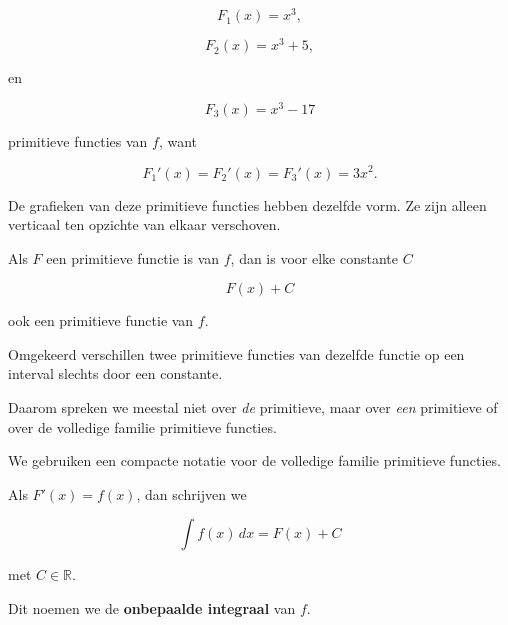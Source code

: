 \documentclass{ximera}
\begin{document}
\[
F_1(x)=x^3,
\]

\[
F_2(x)=x^3+5,
\]

en

\[
F_3(x)=x^3-17
\]

primitieve functies van \(f\), want

\[
F_1'(x)=F_2'(x)=F_3'(x)=3x^2.
\]

De grafieken van deze primitieve functies hebben dezelfde vorm. Ze zijn
alleen verticaal ten opzichte van elkaar verschoven.

\begin{center}
\end{center}

\begin{eigenschap}
Als \(F\) een primitieve functie is van \(f\), dan is voor elke
constante \(C\)

\[
\boxed{F(x)+C}
\]

ook een primitieve functie van \(f\).

Omgekeerd verschillen twee primitieve functies van dezelfde functie op
een interval slechts door een constante.
\end{eigenschap}

Daarom spreken we meestal niet over \emph{de} primitieve, maar over
\emph{een} primitieve of over de volledige familie primitieve functies.



We gebruiken een compacte notatie voor de volledige familie primitieve
functies.

\begin{definitie}
Als \(F'(x)=f(x)\), dan schrijven we

\[
\boxed{
\int f(x)\,dx=F(x)+C
}
\]

met \(C\in\mathbb{R}\).

Dit noemen we de \textbf{onbepaalde integraal} van \(f\).
\end{definitie}
\end{document}
